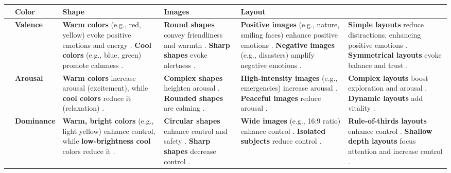 \renewcommand{\arraystretch}{1.8} %
\begin{table*}[ht]
\fontsize{8}{9}\selectfont
\centering

\begin{tabularx}{\textwidth}{|>{\centering\arraybackslash}m{0.5cm}|>{\centering\arraybackslash}m{1.4cm}|>{\centering\arraybackslash}m{3.4cm}|>{\centering\arraybackslash}m{3.4cm}|>{\centering\arraybackslash}m{3.4cm}|>{\centering\arraybackslash}m{3.4cm}|}
\hline
\rowcolor[HTML]{D9EAD3} 
\multicolumn{2}{|c|}{\textbf{Dimension}} & \textbf{Color} & \textbf{Shape} & \textbf{Images} & \textbf{Layout} \\ \hline

\multirow{3}{*}{\rotatebox{90}{\parbox{3cm}{\centering \textbf{Emotional \\ Dimensions}}}} & 
\cellcolor[HTML]{FDF6E8} \textbf{Valence} & 
\textbf{Warm colors} (e.g., red, yellow) evoke positive emotions and energy \cite{jonauskaite2019color,kallabis2024investigating}. \textbf{Cool colors} (e.g., blue, green) promote calmness \cite{wilms2018color}. & 
\textbf{Round shapes} convey friendliness and warmth \cite{wei2006image}. \textbf{Sharp shapes} evoke alertness \cite{thumfart2008modeling}. & 
\textbf{Positive images} (e.g., nature, smiling faces) enhance positive emotions \cite{hou2024emotional}. \textbf{Negative images} (e.g., disasters) amplify negative emotions \cite{pfeuffer122measuring}. & 
\textbf{Simple layouts} reduce distractions, enhancing positive emotions \cite{lu2017investigation}. \textbf{Symmetrical layouts} evoke balance and trust \cite{fiorini2024role}. \\ \cline{2-6}

& \cellcolor[HTML]{FDF6E8} \textbf{Arousal} & 
\textbf{Warm colors} increase arousal (excitement), while \textbf{cool colors} reduce it (relaxation) \cite{jonauskaite2019color}. & 
\textbf{Complex shapes} heighten arousal \cite{lu2012shape}. 
\textbf{Rounded shapes} are calming \cite{etzi2016arousing}. & 
\textbf{High-intensity images} (e.g., emergencies) increase arousal \cite{pfeuffer122measuring}. \textbf{Peaceful images} reduce arousal \cite{hao2024judging}. & 
\textbf{Complex layouts} boost exploration and arousal \cite{carretie2019emomadrid}. \textbf{Dynamic layouts} add vitality \cite{lu2020exploring}. \\ \cline{2-6}

& \cellcolor[HTML]{FDF6E8} \textbf{Dominance} & 
\textbf{Warm, bright colors} (e.g., light yellow) enhance control, while \textbf{low-brightness cool} colors reduce it \cite{weijs2023effects}. & 
\textbf{Circular shapes} enhance control and safety \cite{lu2012shape}. \textbf{Sharp shapes} decrease control \cite{wei2006image}. & 
\textbf{Wide images} (e.g., 16:9 ratio) enhance control \cite{kuzinas2024creative}. \textbf{Isolated subjects} reduce control \cite{lin2023effect}. & 
\textbf{Rule-of-thirds layouts} enhance control \cite{machajdik2010affective}. 
\textbf{Shallow depth layouts} focus attention and increase control \cite{datta2006studying}. \\ \hline


\end{tabularx}
\end{table*}
